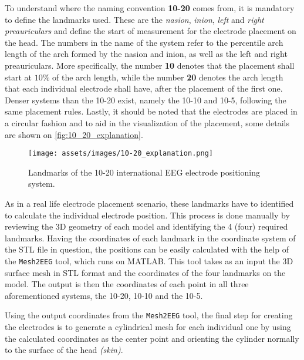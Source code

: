 To understand where the naming convention \textbf{10-20} comes from, it is mandatory to define the landmarks used. These are the \textit{\gls{nasion}}, \textit{\gls{inion}}, \textit{left} and \textit{right \gls{preauricular}s} and define the start of measurement for the electrode placement on the head. The numbers in the name of the system refer to the percentile arch length of the arch formed by the \gls{nasion} and \gls{inion}, as well as the left and right \gls{preauricular}s. More specifically, the number \textbf{10} denotes that the placement shall start at $10\%$ of the arch length, while the number \textbf{20} denotes the arch length that each individual electrode shall have, after the placement of the first one. Denser systems than the 10-20 exist, namely the 10-10 and 10-5, following the same placement rules. Lastly, it should be noted that the electrodes are placed in a circular fashion and to aid in the visualization of the placement, some details are shown on \autoref{fig:10_20_explanation}.

\begin{figure}[H]
    \centering
    \texttt{[image: assets/images/10-20\_explanation.png]}
    \caption[Landmarks of the 10-20 international \gls{EEG} electrode positioning system]{Landmarks of the 10-20 international \gls{EEG} electrode positioning system. \cite[figure 13.2, p.368]{Malmivuo1995}}
    \label{fig:10_20_explanation}
\end{figure}

As in a real life electrode placement scenario, these landmarks have to identified to calculate the individual electrode position. This process is done manually by reviewing the 3D geometry of each model and identifying the 4 (four) required landmarks. Having the coordinates of each landmark in the coordinate system of the \gls{STL} file in question, the positions can be easily calculated with the help of the \texttt{Mesh2EEG} \cite{Giacometti2014} tool, which runs on \gls{MATLAB}. This tool takes as an input the 3D surface mesh in \gls{STL} format and the coordinates of the four landmarks on the model. The output is then the coordinates of each point in all three aforementioned systems, the 10-20, 10-10 and the 10-5.

Using the output coordinates from the \texttt{Mesh2EEG} \cite{Giacometti2014} tool, the final step for creating the electrodes is to generate a cylindrical mesh for each individual one by using the calculated coordinates as the center point and orienting the cylinder normally to the surface of the head \textit{(skin)}.
\\\vspace{1pt}

